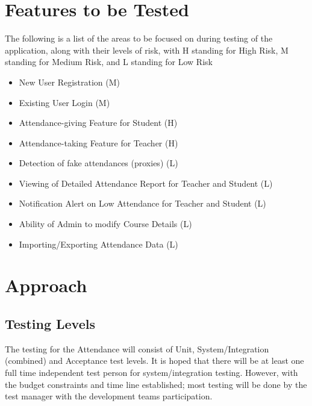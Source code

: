 \documentclass{scrreprt}
\begin{document}
\chapter{Features to be Tested}
The following is a list of the areas to be focused on during testing of the application, along with their levels of risk, with H standing for High Risk, M standing for Medium Risk, and L standing for Low Risk 
\begin{itemize}
\item New User Registration (M)
\item Existing User Login (M)
\item Attendance-giving Feature for Student (H)
\item Attendance-taking Feature for Teacher (H)
\item Detection of fake attendances (proxies) (L)
\item Viewing of Detailed Attendance Report for Teacher and Student (L)
\item Notification Alert on Low Attendance for Teacher and Student (L)
\item Ability of Admin to modify Course Details (L)
\item Importing/Exporting Attendance Data (L)
\end{itemize}

\chapter{Approach}

\section{Testing Levels}
The testing for the Attendance will consist of Unit, System/Integration (combined) and Acceptance test levels. It is hoped that there will be at least one full time independent test person for system/integration testing. However, with the budget constraints and time line established; most testing will be done by the test manager with the development teams participation.
\end{document}
